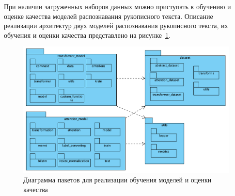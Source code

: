 При наличии загруженных наборов данных можно приступать к обучению и оценке качества моделей распознавания рукописного текста.
Описание реализации архитектур двух моделей распознавания рукописного текста, их обучения и оценки качества представлено на рисунке~\ref{fig:diagram_hrtr}.

\begin{figure}[h!]
    \centering
    \includegraphics[width=\textwidth]{img/diagram_hrtr}
    \caption{Диаграмма пакетов для реализации обучения моделей и оценки качества}
    \label{fig:diagram_hrtr}
\end{figure}

